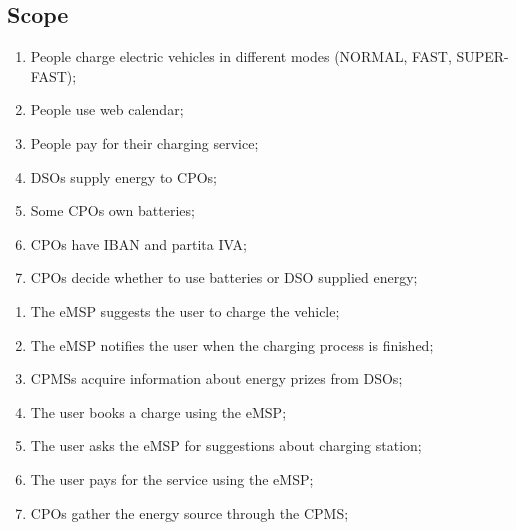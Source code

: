 \subsection{Scope}

\begin{enumerate}[label=\textbf{WP\arabic*}]
    \item People charge electric vehicles in different modes (NORMAL, FAST, SUPER-FAST); \label{world:people-charge-vehicles}
    \item People use web calendar; \label{world:people-use-calendars}
    \item People pay for their charging service; \label{world:people-pay-service}
    \item \acp{DSO} supply energy to \acp{CPO}; \label{world:DSO-supply-energy}
    \item Some \acp{CPO} own batteries; \label{world:CPO-own-batteries}
    \item \acp{CPO} have \ac{IBAN} and \gls{partita IVA};\label{world:CPO-have-partitaIVA}
    \item \acp{CPO} decide whether to use batteries or \ac{DSO} supplied energy; \label{world:CPO-decide-energy}
\end{enumerate}
\begin{enumerate}[label=\textbf{SP\arabic*}]
    \item The \ac{eMSP} suggests the user to charge the vehicle; \label{shared:eMSP-suggests-charge}
    \item The \ac{eMSP} notifies the user when the charging process is finished; \label{shared:eMSP-notifies-charging-finished}
    \item \acp{CPMS} acquire information about energy prizes from \acp{DSO}; \label{shared:CPMS-info-from-DSO}
    \item The user books a charge using the \ac{eMSP}; \label{shared:user-books-charge}
    \item The user asks the \ac{eMSP} for suggestions about charging station; \label{shared:user-asks-suggestions}
    \item The user pays for the service using the \ac{eMSP}; \label{shared:user-pays-service}
    \item \acp{CPO} gather the energy source through the \ac{CPMS}; \label{shared:CPO-energy-through-CPMS}
\end{enumerate}

